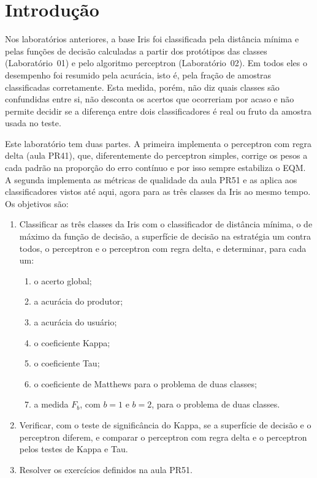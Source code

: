 \documentclass[12pt,a4paper]{article}
\begin{document}
\tableofcontents
\thispagestyle{empty}
\newpage

\section{Introdução}

Nos laboratórios anteriores, a base Iris foi classificada pela distância mínima e pelas funções de decisão calculadas a partir dos protótipos das classes (Laboratório~01) e pelo algoritmo perceptron (Laboratório~02). Em todos eles o desempenho foi resumido pela acurácia, isto é, pela fração de amostras classificadas corretamente. Esta medida, porém, não diz quais classes são confundidas entre si, não desconta os acertos que ocorreriam por acaso e não permite decidir se a diferença entre dois classificadores é real ou fruto da amostra usada no teste.

Este laboratório tem duas partes. A primeira implementa o perceptron com regra delta (aula PR41), que, diferentemente do perceptron simples, corrige os pesos a cada padrão na proporção do erro contínuo e por isso sempre estabiliza o EQM. A segunda implementa as métricas de qualidade da aula PR51 e as aplica aos classificadores vistos até aqui, agora para as três classes da Iris ao mesmo tempo. Os objetivos são:
\begin{enumerate}
  \item Classificar as três classes da Iris com o classificador de distância mínima, o de máximo da função de decisão, a superfície de decisão na estratégia um contra todos, o perceptron e o perceptron com regra delta, e determinar, para cada um:
  \begin{enumerate}
    \item o acerto global;
    \item a acurácia do produtor;
    \item a acurácia do usuário;
    \item o coeficiente Kappa;
    \item o coeficiente Tau;
    \item o coeficiente de Matthews para o problema de duas classes;
    \item a medida $F_b$, com $b = 1$ e $b = 2$, para o problema de duas classes.
  \end{enumerate}
  \item Verificar, com o teste de significância do Kappa, se a superfície de decisão e o perceptron diferem, e comparar o perceptron com regra delta e o perceptron pelos testes de Kappa e Tau.
  \item Resolver os exercícios definidos na aula PR51.
\end{enumerate}
\end{document}
